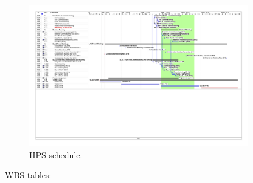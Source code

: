 \begin{figure}[h]
\centering
\includegraphics*[angle=90,width=0.85\textwidth]{cost_schedule/ScheduleHPSV470-3.jpg} 
\caption{HPS schedule.}
\label{fig:schedulec}
\end{figure}


\clearpage
WBS tables:



